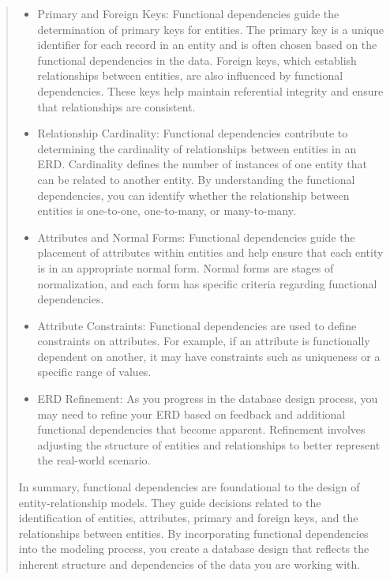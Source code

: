 \documentclass[11pt]{article}
\begin{document}
\begin{enumerate}
\begin{quotation}
\begin{itemize}
  \item  Primary and Foreign Keys:
        Functional dependencies guide the determination of primary keys for entities. The primary key is a unique identifier for each record in an entity and is often chosen based on the functional dependencies in the data.
        Foreign keys, which establish relationships between entities, are also influenced by functional dependencies. These keys help maintain referential integrity and ensure that relationships are consistent.

\item    Relationship Cardinality:
        Functional dependencies contribute to determining the cardinality of relationships between entities in an ERD. Cardinality defines the number of instances of one entity that can be related to another entity.
        By understanding the functional dependencies, you can identify whether the relationship between entities is one-to-one, one-to-many, or many-to-many.

\item    Attributes and Normal Forms:
        Functional dependencies guide the placement of attributes within entities and help ensure that each entity is in an appropriate normal form. Normal forms are stages of normalization, and each form has specific criteria regarding functional dependencies.

\item    Attribute Constraints:
        Functional dependencies are used to define constraints on attributes. For example, if an attribute is functionally dependent on another, it may have constraints such as uniqueness or a specific range of values.

\item    ERD Refinement:
        As you progress in the database design process, you may need to refine your ERD based on feedback and additional functional dependencies that become apparent. Refinement involves adjusting the structure of entities and relationships to better represent the real-world scenario.
\end{itemize}
In summary, functional dependencies are foundational to the design of entity-relationship models. They guide decisions related to the identification of entities, attributes, primary and foreign keys, and the relationships between entities. By incorporating functional dependencies into the modeling process, you create a database design that reflects the inherent structure and dependencies of the data you are working with.
\end{quotation}


\end{enumerate}
\end{document}
